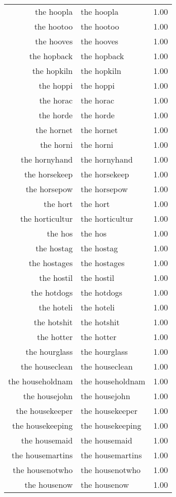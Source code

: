 \begin{table}[ht]
\begin{tabular}{rlr}
  the hoopla & the hoopla & 1.00 \\ 
  the hootoo & the hootoo & 1.00 \\ 
  the hooves & the hooves & 1.00 \\ 
  the hopback & the hopback & 1.00 \\ 
  the hopkiln & the hopkiln & 1.00 \\ 
  the hoppi & the hoppi & 1.00 \\ 
  the horac & the horac & 1.00 \\ 
  the horde & the horde & 1.00 \\ 
  the hornet & the hornet & 1.00 \\ 
  the horni & the horni & 1.00 \\ 
  the hornyhand & the hornyhand & 1.00 \\ 
  the horsekeep & the horsekeep & 1.00 \\ 
  the horsepow & the horsepow & 1.00 \\ 
  the hort & the hort & 1.00 \\ 
  the horticultur & the horticultur & 1.00 \\ 
  the hos & the hos & 1.00 \\ 
  the hostag & the hostag & 1.00 \\ 
  the hostages & the hostages & 1.00 \\ 
  the hostil & the hostil & 1.00 \\ 
  the hotdogs & the hotdogs & 1.00 \\ 
  the hoteli & the hoteli & 1.00 \\ 
  the hotshit & the hotshit & 1.00 \\ 
  the hotter & the hotter & 1.00 \\ 
  the hourglass & the hourglass & 1.00 \\ 
  the houseclean & the houseclean & 1.00 \\ 
  the householdnam & the householdnam & 1.00 \\ 
  the housejohn & the housejohn & 1.00 \\ 
  the housekeeper & the housekeeper & 1.00 \\ 
  the housekeeping & the housekeeping & 1.00 \\ 
  the housemaid & the housemaid & 1.00 \\ 
  the housemartins & the housemartins & 1.00 \\ 
  the housenotwho & the housenotwho & 1.00 \\ 
  the housenow & the housenow & 1.00 \\ 

\end{tabular}
\end{table}
